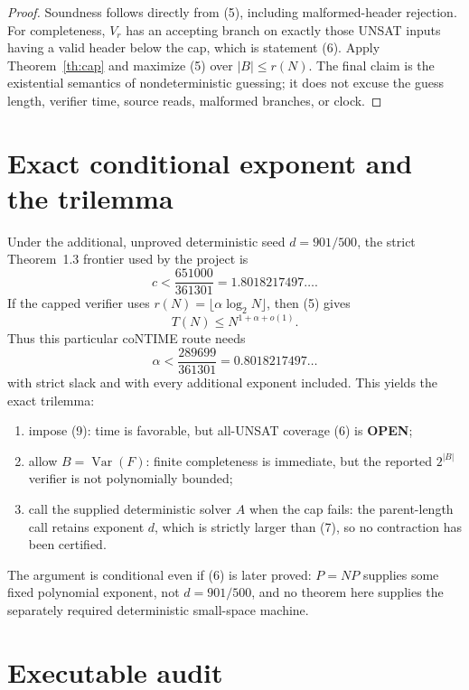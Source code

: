 \documentclass[11pt]{article}
\newcommand{\status}[1]{\textbf{#1}}
\begin{document}
\begin{proof}
Soundness follows directly from (5), including malformed-header rejection.
For completeness, $V_r$ has an accepting branch on exactly those UNSAT
inputs having a valid header below the cap, which is statement (6).  Apply
Theorem~\ref{th:cap} and maximize (5) over $|B|\le r(N)$.  The final claim is
the existential semantics of nondeterministic guessing; it does not excuse
the guess length, verifier time, source reads, malformed branches, or clock.
\end{proof}

\section{Exact conditional exponent and the trilemma}

Under the additional, unproved deterministic seed
$d=901/500$, the strict Theorem~1.3 frontier used by the project is
\[
 c<\frac{651000}{361301}=1.8018217497\ldots.                     \tag{7}
\]
If the capped verifier uses
$r(N)=\lfloor\alpha\log_2N\rfloor$, then (5) gives
\[
 T(N)\le N^{1+\alpha+o(1)}.                                    \tag{8}
\]
Thus this particular coNTIME route needs
\[
 \alpha<\frac{289699}{361301}=0.8018217497\ldots                \tag{9}
\]
with strict slack and with every additional exponent included.  This yields
the exact trilemma:
\begin{enumerate}
\item impose (9): time is favorable, but all-UNSAT coverage (6) is
      \status{OPEN};
\item allow $B=\operatorname{Var}(F)$: finite completeness is immediate,
      but the reported $2^{|B|}$ verifier is not polynomially bounded;
\item call the supplied deterministic solver $A$ when the cap fails: the
      parent-length call retains exponent $d$, which is strictly larger than
      (7), so no contraction has been certified.
\end{enumerate}
The argument is conditional even if (6) is later proved: $P=NP$ supplies
some fixed polynomial exponent, not $d=901/500$, and no theorem here supplies
the separately required deterministic small-space machine.

\section{Executable audit}
\end{document}
